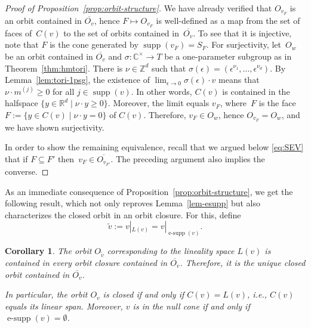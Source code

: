 \documentclass[10pt,a4paper]{article}
\DeclareMathOperator{\supp}{supp}
\DeclareMathOperator{\esupp}{e-supp}
\newtheorem{corollary}[theorem]{Corollary}
\theoremstyle{definition}
\numberwithin{equation}{section}
\newcommand{\CC}{\mathbb{C}}
\newcommand{\ZZ}{\mathbb{Z}}
\newcommand{\RR}{\mathbb{R}}
\begin{document}
\begin{proof}[Proof of Proposition~\ref{prop:orbit-structure}]
We have already verified that $O_{v_F}$ is an orbit contained in $\overline{O_v}$, hence $F \mapsto O_{v_F}$ is well-defined as a map from the set of faces of~$C(v)$ to the set of orbits contained in~$\overline{O_v}$.
To see that it is injective, note that $F$ is the cone generated by $\supp(v_F) = S_F$.
For surjectivity, let~$O_w$ be an orbit contained in $\overline{O_v}$ and $\sigma\colon\CC^\times\rightarrow T$ be a one-parameter subgroup as in Theorem~\ref{thm:hmtori}.
There is $\nu\in\ZZ^d$ such that
$\sigma(\epsilon) = (\epsilon^{\nu_1},\ldots,\epsilon^{\nu_d})$.
By Lemma~\ref{lem:tori-1psg}, the existence of $\lim_{\epsilon\to 0}\sigma(\epsilon) \cdot v$ means that $\nu\cdot m^{(j)} \ge 0$ for all $j\in \supp(v)$.
In other words, $C(v)$ is contained in the halfspace
$\{ y\in\RR^d \mid \nu \cdot y \ge 0 \}$.
Moreover, the limit equals $v_F$, where~$F$ is the face
$F := \{ y\in C(v) \mid \nu \cdot y = 0 \}$ of $C(v)$.
Therefore, $v_F \in O_w$, hence $O_{v_F}=O_w$, and we have shown surjectivity.

In order to show the remaining equivalence, recall that we argued below \eqref{eq:SEV} that if $F \subseteq F'$ then~$v_F \in \overline{O_{v_{F'}}}$.
The preceding argument also implies the converse.
\end{proof}

As an immediate consequence of Proposition~\ref{prop:orbit-structure}, we get the following result, which not only reproves Lemma~\ref{lem-esupp} but also characterizes the closed orbit in an orbit closure.
For this, define
\[
  \widetilde{v} := v|_{L(v)} = v|_{\esupp(v)}.
\]
%
%

\begin{corollary}\label{cor:CO}
The orbit $O_{\tilde v}$ corresponding to the lineality space $L(v)$
is contained in every orbit closure contained in $\overline{O_v}$.
Therefore, it is the unique closed orbit contained in $\overline{O_v}$.

In particular, the orbit $O_v$ is closed if and only if $C(v) = L(v)$, i.e., $C(v)$ equals its linear span.
Moreover, $v$ is in the null cone if and only if $\esupp(v) = \emptyset$.
%
\end{corollary}

%
%
\end{document}

